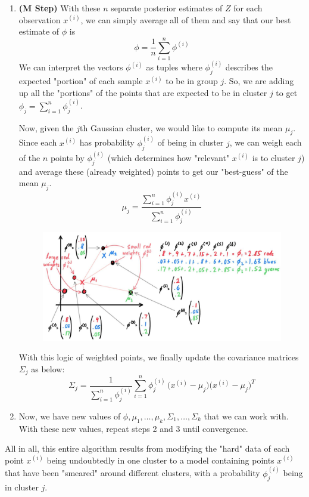 \begin{definition}[EM Algorithm]
\begin{enumerate}
          \item \textbf{(M Step)} With these $n$ separate posterior estimates of $Z$ for each observation $x^{(i)}$, we can simply average all of them and say that our best estimate of $\phi$ is
          \[\phi = \frac{1}{n} \sum_{i=1}^n \phi^{(i)}\]
          We can interpret the vectors $\phi^{(i)}$ as tuples where $\phi^{(i)}_j$ describes the expected "portion" of each sample $x^{(i)}$ to be in group $j$. So, we are adding up all the "portions" of the points that are expected to be in cluster $j$ to get $\phi_j = \sum_{i=1}^n \phi_j^{(i)}$.

          Now, given the $j$th Gaussian cluster, we would like to compute its mean $\mu_j$. Since each $x^{(i)}$ has probability $\phi^{(i)}_j$ of being in cluster $j$, we can weigh each of the $n$ points by $\phi^{(i)}_j$ (which determines how "relevant" $x^{(i)}$ is to cluster $j$) and average these (already weighted) points to get our "best-guess" of the mean $\mu_j$.
          \[\mu_j = \frac{\sum_{i=1}^n \phi^{(i)}_j x^{(i)}}{\sum_{i=1}^n \phi_j^{(i)}}\]

          \begin{figure}[H]
            \centering 
            \includegraphics[scale=0.27]{img/weighted_means.jpg}
            \caption{} 
            \label{fig:weighted_means}
          \end{figure}

          With this logic of weighted points, we finally update the covariance matrices $\Sigma_j$ as below:
          \[\Sigma_j = \frac{1}{\sum_{i=1}^n \phi_j^{(i)}} \sum_{i=1}^n \phi^{(i)}_j \,\big(x^{(i)} - \mu_j\big)\big(x^{(i)} - \mu_j\big)^T\]

          \item Now, we have new values of $\phi, \mu_1, \ldots, \mu_k, \Sigma_1, \ldots, \Sigma_k$ that we can work with. With these new values, repeat steps 2 and 3 until convergence.
        \end{enumerate}

        All in all, this entire algorithm results from modifying the "hard" data of each point $x^{(i)}$ being undoubtedly in one cluster to a model containing points $x^{(i)}$ that have been "smeared" around different clusters, with a probability $\phi_j^{(i)}$ being in cluster $j$. 
      \end{definition}


